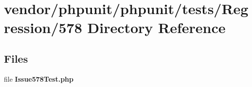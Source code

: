 \section{vendor/phpunit/phpunit/tests/\+Regression/578 Directory Reference}
\label{dir_c24dc56e67ca9597c557d93921e7d755}
\subsection*{Files}
\begin{DoxyCompactItemize}
\item 
file {\bf Issue578\+Test.\+php}
\end{DoxyCompactItemize}
